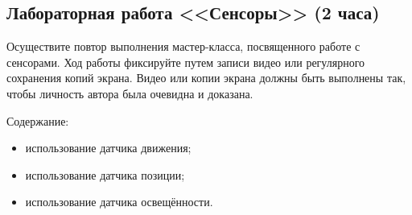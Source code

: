 \subsection{Лабораторная работа <<Сенсоры>> (2 часа)}

Осуществите повтор выполнения мастер-класса, посвященного работе с сенсорами. Ход работы фиксируйте путем записи видео или регулярного сохранения копий экрана. Видео или копии экрана должны быть выполнены так, чтобы личность автора была очевидна и доказана.

Содержание:

\begin{itemize}
	\item использование датчика движения;
	\item использование датчика позиции;
	\item использование датчика освещённости.
\end{itemize}
